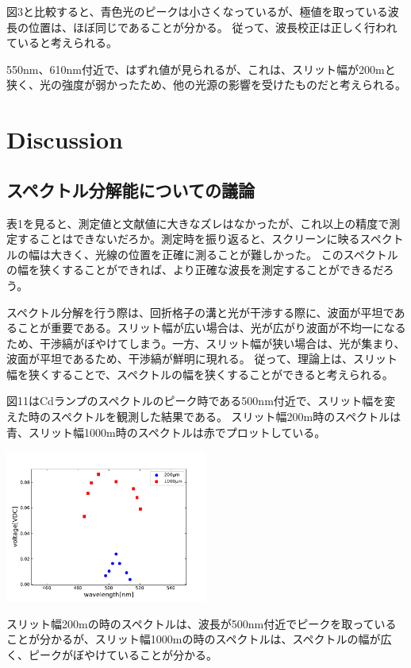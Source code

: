 \documentclass[a4paper,10pt]{jsarticle}
\makeatletter
\newenvironment{figurehere}
{\def\@captype{figure}}
{}
\makeatother
\begin{document}
\begin{multicols}{2}
図3と比較すると、青色光のピークは小さくなっているが、極値を取っている波長の位置は、ほぼ同じであることが分かる。
従って、波長校正は正しく行われていると考えられる。


550nm、610nm付近で、はずれ値が見られるが、これは、スリット幅が200\textmu mと狭く、光の強度が弱かったため、他の光源の影響を受けたものだと考えられる。
\section{Discussion}
\subsection{スペクトル分解能についての議論}
表1を見ると、測定値と文献値に大きなズレはなかったが、これ以上の精度で測定することはできないだろか。測定時を振り返ると、スクリーンに映るスペクトルの幅は大きく、光線の位置を正確に測ることが難しかった。
このスペクトルの幅を狭くすることができれば、より正確な波長を測定することができるだろう。

スペクトル分解を行う際は、回折格子の溝と光が干渉する際に、波面が平坦であることが重要である。スリット幅が広い場合は、光が広がり波面が不均一になるため、干渉縞がぼやけてしまう。一方、スリット幅が狭い場合は、光が集まり、波面が平坦であるため、干渉縞が鮮明に現れる。
従って、理論上は、スリット幅を狭くすることで、スペクトルの幅を狭くすることができると考えられる。

図11はCdランプのスペクトルのピーク時である500nm付近で、スリット幅を変えた時のスペクトルを観測した結果である。
スリット幅200\textmu m時のスペクトルは青、スリット幅1000\textmu m時のスペクトルは赤でプロットしている。

\begin{figurehere}
 \centering
 \includegraphics[width=0.5\textwidth]{figs/slit_comparison.pdf} 
 \caption{Cdランプのスリット幅1000\textmu m、200\textmu mの時のスペクトル}
\end{figurehere}

スリット幅200\textmu mの時のスペクトルは、波長が500nm付近でピークを取っていることが分かるが、スリット幅1000\textmu mの時のスペクトルは、スペクトルの幅が広く、ピークがぼやけていることが分かる。


\end{multicols}
\end{document}
